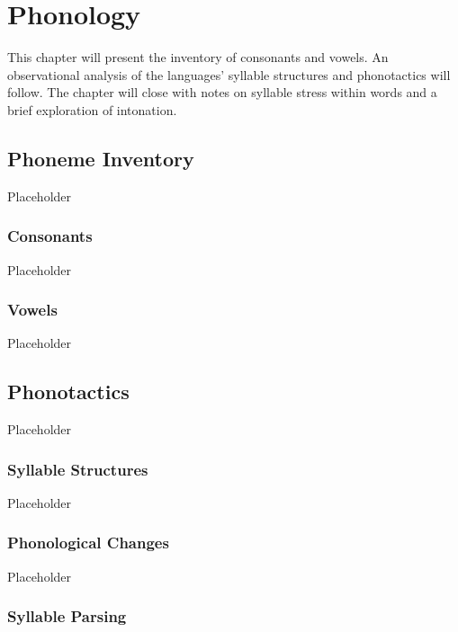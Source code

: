 \chapter{Phonology}
\label{cha:tvk-phonology}

This chapter will present the inventory of consonants and vowels. An observational analysis of the \langtvk{} languages' syllable structures and phonotactics will follow. The chapter will close with notes on syllable stress within words and a brief exploration of intonation.

\section{\langtvk{} Phoneme Inventory}
\label{sec:tvk-phone-inventory}

Placeholder

\subsection{Consonants}
\label{subsec:tvk-consonants}

Placeholder

\subsection{Vowels}
\label{subsec:tvk-vowels}

Placeholder

\section{\langtvk{} Phonotactics}
\label{sec:tvk-phonotactics}

Placeholder

\subsection{Syllable Structures}
\label{subsec:tvk-syll-struc}

Placeholder

\subsection{Phonological Changes}
\label{subsec:tvk-phone-changes}

Placeholder

\subsection{Syllable Parsing}
\label{subsec:tvk-syll-parse}

